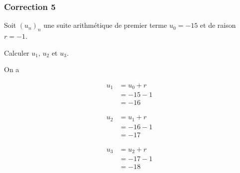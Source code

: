 \documentclass[15pt, mathserif]{beamer}
\begin{document}
\begin{frame}
\vspace{-10mm}
	\frametitle{Correction 5}
Soit $(u_n)_n$ une suite arithmétique de premier terme $u_0=-15$ et de raison $r=-1$. 
 
 Calculer $u_1$, $u_2$ et $u_3$. 
 
 On a 
 \begin{minipage}{0.25\textwidth} 
 
 \begin{align*} 
 u_1 &= u_0+r \\ &= -15-1 \\ &=-16
 \end{align*} 
  
 \end{minipage} \hfil \begin{minipage}{0.25\textwidth} 
 
 \begin{align*} 
 u_2 &= u_1+r \\ &= -16-1 \\ &=-17
 \end{align*} 
 
 \end{minipage} \hfil \begin{minipage}{0.25\textwidth} 
 
 \begin{align*} 
 u_3 &= u_2+r \\ &= -17-1 \\ &=-18
 \end{align*} 
 
 \end{minipage} 
\end{frame}
\end{document}

